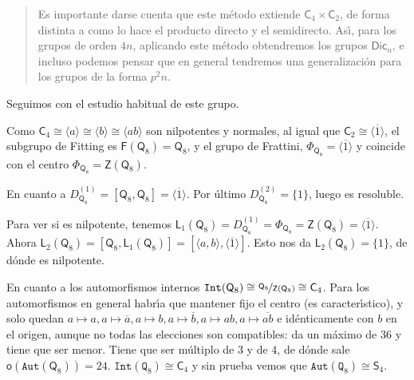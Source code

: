 \documentclass[final,12pt,a4paper,twoside,fleqn]{extbook}
\newcommand{\grclass}[1]{\ensuremath{\mathsf{#1}}}
\newcommand{\cyclicgr}[1]{\ensuremath{{\grclass{C}}_{#1}}}
\theoremstyle{definition}
\theoremstyle{remark}
\begin{document}
	\begin{quote}
		Es importante darse cuenta que este m\'etodo extiende $\cyclicgr{4}                  \times                  \cyclicgr{2}$, de forma distinta a como lo hace el producto directo y el semidirecto. As{\'{\i}}, para los grupos de orden $4n$, aplicando este m\'etodo obtendremos los grupos $\mathsf{Dic}_{n}$, e incluso podemos pensar que en general tendremos una generalizaci\'on para los grupos de la forma $p^2 n$.
	\end{quote}	
	
	
		
	Seguimos con el estudio habitual de este grupo.	

    Como $\cyclicgr{4}                  \cong                  \langle a\rangle                  \cong                  \langle b\rangle                  \cong                  \langle ab\rangle$ son nilpotentes y normales, al igual que $\cyclicgr{2}                  \cong                  \langle\overline{1}\rangle$, el subgrupo de Fitting es $\mathsf{F}(\mathsf{Q}_8)=\mathsf{Q}_8$, y el grupo de Frattini, $\Phi_{\mathsf{Q}_8}=\langle \overline{1}\rangle$ y coincide con el centro $\Phi_{\mathsf{Q}_8}=\mathsf{Z}(\mathsf{Q}_8)$.

    En cuanto a $D_{\mathsf{Q}_8}^{(1)}=\left[{\mathsf{Q}_8,\mathsf{Q}_8}\right]=\langle \overline{1}\rangle$. Por \'ultimo $D_{\mathsf{Q}_8}^{(2)}=\{1\}$, luego es resoluble.

    Para ver si es nilpotente, tenemos $\mathsf{L}_{1}(\mathsf{Q}_8)=D_{\mathsf{Q}_8}^{(1)}=\Phi_{\mathsf{Q}_8}=\mathsf{Z}(\mathsf{Q}_8)=\langle{\overline{1}}\rangle$. Ahora $\mathsf{L}_{2}(\mathsf{Q}_8)=\left[\mathsf{Q}_8,\mathsf{L}_1(\mathsf{Q}_8)\right]=\left[\langle{a,b}\rangle,\langle{\overline{1}}\rangle\right]$. Esto nos da $\mathsf{L}_{2}(\mathsf{Q}_8)=\{1\}$, de d\'onde es nilpotente.

    En cuanto a los automorfismos internos $\mathtt{Int}(\mathsf{Q}_8)                  \cong                   \nicefrac{\mathsf{Q}_8}{\mathsf{Z}(\mathsf{Q}_8)}                  \cong                  \mathsf{C}_4$. Para los automorfismos en general habr{\'{\i}}a que mantener fijo el centro (es caracter{\'{\i}}stico), y solo quedan $a                  \mapsto a,a                  \mapsto \overline{a},a                  \mapsto b,a                  \mapsto \overline{b},a                  \mapsto {ab},a                  \mapsto \overline{ab}$ e id\'enticamente con $b$ en el origen, aunque no todas las elecciones son compatibles: da un m\'aximo de $36$ y tiene que ser menor. Tiene que ser m\'ultiplo de $3$ y de $4$, de d\'onde sale $\mathsf{o}\left(\mathtt{Aut}(\mathsf{Q}_8)\right)=24$. $\mathtt{Int}(\mathtt{Q}_8)                  \cong                  \mathsf{C}_4$ y sin prueba vemos que $\mathtt{Aut}(\mathtt{Q}_8)                  \cong                  \mathsf{S}_4$.
\end{document}
